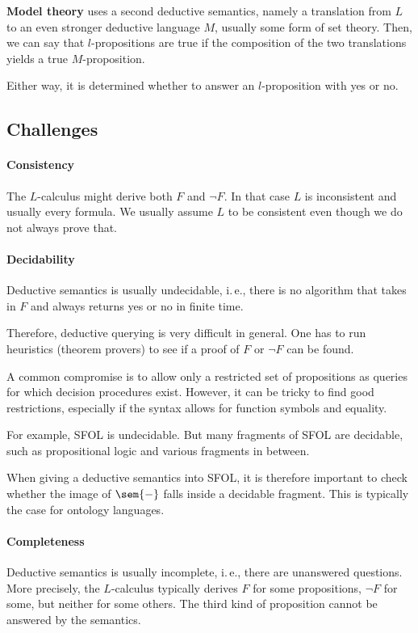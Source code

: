 \textbf{Model theory} uses a second deductive semantics, namely a translation from $L$ to an even stronger deductive language $M$, usually some form of set theory.
Then, we can say that $l$-propositions are true if the composition of the two translations yields a true $M$-proposition.

Either way, it is determined whether to answer an $l$-proposition with yes or no.

\subsection{Challenges}

\paragraph{Consistency}
The $L$-calculus might derive both $F$ and $\neg F$.
In that case $L$ is inconsistent and usually every formula.
We usually assume $L$ to be consistent even though we do not always prove that.

\paragraph{Decidability}
Deductive semantics is usually undecidable, i.\,e., there is no algorithm that takes in $F$
and always returns yes or no in finite time. 

Therefore, deductive querying is very difficult in general.
One has to run heuristics (theorem provers) to see if a proof of $F$ or $\neg F$ can be found.

A common compromise is to allow only a restricted set of propositions as queries for which decision procedures exist.
However, it can be tricky to find good restrictions, especially if the syntax allows for function symbols and equality.

For example, SFOL is undecidable.
But many fragments of SFOL are decidable, such as propositional logic and various fragments in between.

When giving a deductive semantics into SFOL, it is therefore important to check whether the image of $\sem{-}$ falls inside a decidable fragment.
This is typically the case for ontology languages.

\paragraph{Completeness}
Deductive semantics is usually incomplete, i.\,e., there are unanswered questions.
More precisely, the $L$-calculus typically derives $F$ for some propositions, $\neg F$ for some, but neither for some others.
The third kind of proposition cannot be answered by the semantics.

